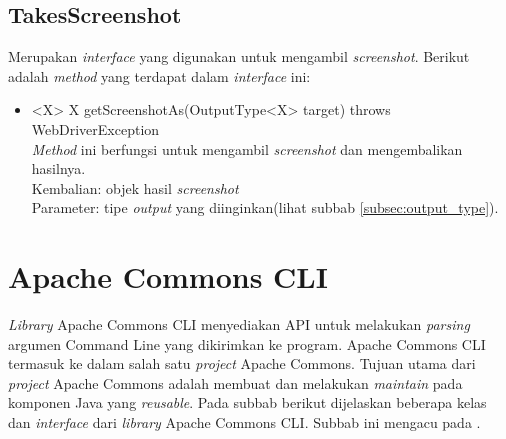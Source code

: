 \subsection{TakesScreenshot}
\label{subsec:takes_screenshot}
Merupakan \textit{interface} yang digunakan untuk mengambil \textit{screenshot}. Berikut adalah \textit{method} yang terdapat dalam \textit{interface} ini:
\begin{itemize}
\item <X> X getScreenshotAs(OutputType<X> target) throws WebDriverException\\
\textit{Method} ini berfungsi untuk mengambil \textit{screenshot} dan mengembalikan hasilnya.\\
Kembalian: objek hasil \textit{screenshot} \\
Parameter: tipe \textit{output} yang diinginkan(lihat subbab \ref{subsec:output_type}).

\end{itemize}


\section{Apache Commons CLI}
\label{subsec:apache_cli}
\textit{Library} Apache Commons CLI menyediakan API untuk melakukan \textit{parsing} argumen Command Line yang dikirimkan ke program\cite{Apache_Commons_CLI}. Apache Commons CLI termasuk ke dalam salah satu \textit{project} Apache Commons. Tujuan utama dari \textit{project} Apache Commons adalah membuat dan melakukan \textit{maintain} pada komponen Java yang \textit{reusable}. Pada subbab berikut dijelaskan beberapa kelas dan \textit{interface} dari \textit{library} Apache Commons CLI. Subbab ini mengacu pada \cite{Apache_java_doc}.

